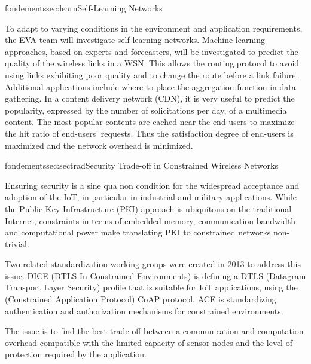 \documentclass{ra2016}
\begin{document}
\begin{module}{fondements}{sec:learn}{Self-Learning Networks}

To adapt to varying conditions in the environment and application requirements, the EVA team will investigate self-learning networks. Machine learning approaches, based on experts and forecasters, will be investigated to predict the quality of the wireless links in a WSN. This allows the routing protocol to avoid using links exhibiting poor quality and to change the route before a link failure. Additional applications include where to place the aggregation function in data gathering.
In a content delivery network (CDN), it is very useful to predict the popularity, expressed 
by the number of solicitations per day, 
of a multimedia content. The most popular contents are cached near the end-users to maximize the hit ratio of end-users' requests. Thus the satisfaction degree of end-users is maximized and the network overhead is minimized. 

\end{module}

\begin{module}{fondements}{sec:sectrad}{Security Trade-off  in Constrained Wireless Networks}

Ensuring security is a {sine qua non} condition for the widespread acceptance and adoption of the IoT, in particular in industrial and military applications. While the Public-Key Infrastructure (PKI) approach is ubiquitous on the traditional Internet, constraints in terms of embedded memory, communication bandwidth and computational power make translating PKI to constrained networks non-trivial.

Two related standardization working groups were created in 2013 to address this issue. DICE (DTLS In Constrained Environments)  is defining a DTLS (Datagram Transport Layer Security)  profile that is suitable for IoT applications, using the (Constrained Application Protocol) CoAP protocol. ACE is standardizing authentication and authorization mechanisms for constrained environments.

The issue is to find the best trade-off between a communication and computation overhead compatible with the limited capacity of sensor nodes and the level of protection required by the application.

\end{module}
\end{document}
